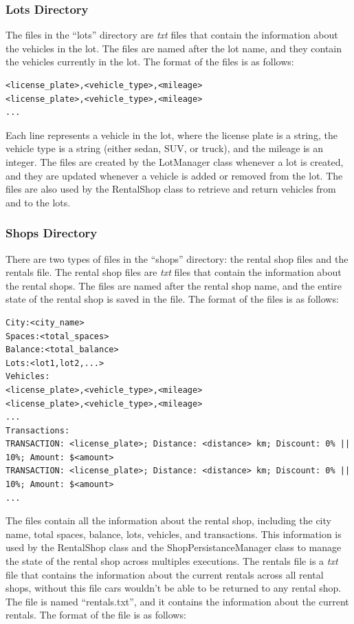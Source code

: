 \documentclass[conference]{IEEEtran}
\begin{document}
\subsubsection{Lots Directory}
The files in the ``lots'' directory are \textit{txt} files that contain the information about the vehicles in the lot. The files are named after the lot name, and they contain the vehicles currently in the lot. The format of the files is as follows:

\begin{lstlisting}[style=input]
<license_plate>,<vehicle_type>,<mileage>
<license_plate>,<vehicle_type>,<mileage>
...
\end{lstlisting}

Each line represents a vehicle in the lot, where the license plate is a string, the vehicle type is a string (either sedan, SUV, or truck), and the mileage is an integer. The files are created by the LotManager class whenever a lot is created, and they are updated whenever a vehicle is added or removed from the lot. The files are also used by the RentalShop class to retrieve and return vehicles from and to the lots.

\subsubsection{Shops Directory}
There are two types of files in the ``shops'' directory: the rental shop files and the rentals file. The rental shop files are \textit{txt} files that contain the information about the rental shops. The files are named after the rental shop name, and the entire state of the rental shop is saved in the file. The format of the files is as follows:

\begin{lstlisting}[style=input]
City:<city_name>
Spaces:<total_spaces>
Balance:<total_balance>
Lots:<lot1,lot2,...>
Vehicles:
<license_plate>,<vehicle_type>,<mileage>
<license_plate>,<vehicle_type>,<mileage>
... 
Transactions:
TRANSACTION: <license_plate>; Distance: <distance> km; Discount: 0% || 10%; Amount: $<amount>
TRANSACTION: <license_plate>; Distance: <distance> km; Discount: 0% || 10%; Amount: $<amount>
...
\end{lstlisting}

The files contain all the information about the rental shop, including the city name, total spaces, balance, lots, vehicles, and transactions. This information is used by the RentalShop class and the ShopPersistanceManager class to manage the state of the rental shop across multiples executions. The rentals file is a \textit{txt} file that contains the information about the current rentals across all rental shops, without this file cars wouldn't be able to be returned to any rental shop. The file is named ``rentals.txt'', and it contains the information about the current rentals. The format of the file is as follows:
\end{document}
